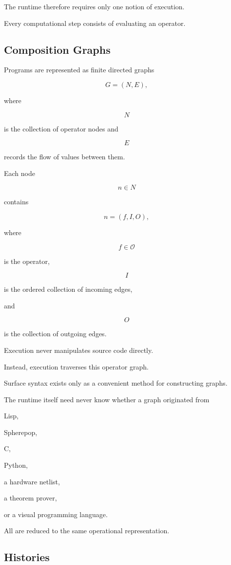 \documentclass[12pt,oneside]{article}
\begin{document}
The runtime therefore requires only one notion of execution.

Every computational step consists of evaluating an operator.

\subsection{Composition Graphs}

Programs are represented as finite directed graphs

\[
G=(N,E),
\]

where

\[
N
\]

is the collection of operator nodes and

\[
E
\]

records the flow of values between them.

Each node

\[
n\in N
\]

contains

\[
n=(f,I,O),
\]

where

\[
f\in\mathcal O
\]

is the operator,

\[
I
\]

is the ordered collection of incoming edges,

and

\[
O
\]

is the collection of outgoing edges.

Execution never manipulates source code directly.

Instead, execution traverses this operator graph.

Surface syntax exists only as a convenient method for constructing graphs.

The runtime itself need never know whether a graph originated from

Lisp,

Spherepop,

C,

Python,

a hardware netlist,

a theorem prover,

or a visual programming language.

All are reduced to the same operational representation.

\subsection{Histories}
\end{document}
